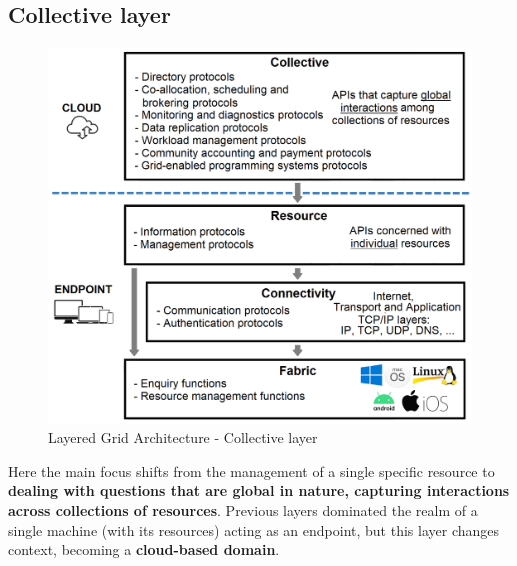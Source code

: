 \subsection{Collective layer}
\begin{figure}[!ht]
    \centering
    \includegraphics[scale=0.34]{document/chapters/chapter_2/images/collective_layer.png}
    \caption{Layered Grid Architecture - Collective layer}
    \label{fig:collective_layer}
\end{figure}

\noindent Here the main focus shifts from the management of a single specific resource to \textbf{dealing with questions that are global in nature, capturing interactions across collections of resources}. Previous layers dominated the realm of a single machine (with its resources) acting as an endpoint, but this layer changes context, becoming a \textbf{cloud-based domain}.

